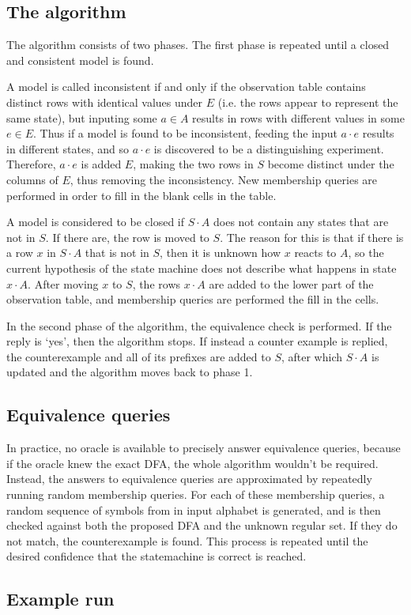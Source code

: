 \documentclass[multi,crop=false,class=article]{standalone}
\newcommand{\concat}{\cdot}
\begin{document}
\subsection {The algorithm}

The algorithm consists of two phases. The first phase is repeated until a closed
and consistent model is found.

A model is called inconsistent if and only if the observation table contains
distinct rows with identical values under $E$ (i.e. the rows appear to represent
the same state), but inputing some $a \in A$ results in rows with different
values in some $e \in E$. Thus if a model is found to be inconsistent, feeding
the input $a \concat e$ results in different states, and so $a \concat e$ is
discovered to be a distinguishing experiment. Therefore, $a \concat e$ is added
$E$, making the two rows in $S$ become distinct under the columns of $E$, thus
removing the inconsistency. New membership queries are performed in order to
fill in the blank cells in the table.

A model is considered to be closed if $S \concat A$ does not contain any states
that are not in $S$. If there are, the row is moved to $S$. The reason for this
is that if there is a row $x$ in $S \concat A$ that is not in $S$, then it is
unknown how $x$ reacts to $A$, so the current hypothesis of the state machine
does not describe what happens in state $x \concat A$. After moving $x$ to $S$,
the rows $x \concat A$ are added to the lower part of the observation table, and
membership queries are performed the fill in the cells. 

In the second phase of the algorithm, the equivalence check is performed. If the
reply is `yes', then the algorithm stops. If instead a counter example is
replied, the counterexample and all of its prefixes are added to $S$, after
which $S \concat A$ is updated and the algorithm moves back to phase 1.

\subsection {Equivalence queries}

In practice, no oracle is available to precisely answer equivalence queries,
because if the oracle knew the exact DFA, the whole algorithm wouldn't be
required. Instead, the answers to equivalence queries are approximated by
repeatedly running random membership queries. For each of these membership
queries, a random sequence of symbols from in input alphabet is generated, and
is then checked against both the proposed DFA and the unknown regular set. If
they do not match, the counterexample is found. This process is repeated until
the desired confidence that the statemachine is correct is reached.

\subsection {Example run}
\end{document}

